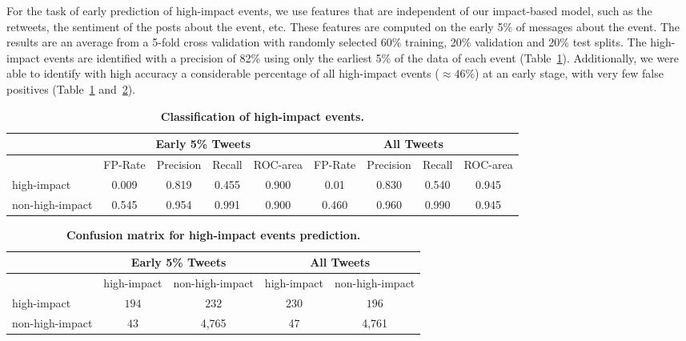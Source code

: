 For the task of early prediction of high-impact events, we use features 
that are independent of our impact-based model, such as
the retweets, the sentiment of the posts about the event, etc. 
These features are computed on the early 5\% of messages about the event.
The results are an average from a 5-fold cross validation with
randomly selected 60\% training, 20\% validation and 20\% test splits.
The high-impact events are identified with a precision of 82\% using
only the earliest 5\% of the data of each event
(Table~\ref{tab:classification_results}).  Additionally, we were able to
identify with high accuracy a considerable percentage of all
high-impact events ($\approx 46\%$) at an early stage, with very few
false positives (Table~\ref{tab:classification_results} and~\ref{tab:confusion_matrix}).

\begin{table}
  \centering
  {\small
    \begin{tabularx}{\textwidth}{lcccc|cccc}
      \toprule
      & \multicolumn{4}{c}{\textbf{Early 5\% Tweets}} & \multicolumn{4}{c}{\textbf{All Tweets}} \\
      \midrule
      & FP-Rate & Precision & Recall & ROC-area & FP-Rate & Precision & Recall & ROC-area \\
      high-impact & 0.009 & 0.819 & 0.455 & 0.900 & 0.01 & 0.830 & 0.540 & 0.945 \\
      non-high-impact & 0.545 & 0.954 & 0.991 & 0.900 &  0.460 & 0.960 & 0.990 & 0.945 \\
      \bottomrule
    \end{tabularx}
  }
  \caption{\textbf{Classification of high-impact events.}}
  \label{tab:classification_results}
\end{table}

\begin{table}
  \centering
  \begin{tabularx}{\textwidth}{lcc|cc}
    \toprule
    \multirow{2}{*}{ }& \multicolumn{2}{c}{\textbf{Early 5\% Tweets}} & \multicolumn{2}{c}{\textbf{All Tweets}} \\
    \midrule
    & high-impact & non-high-impact & high-impact & non-high-impact \\
    high-impact & $194$ & $232$ & $230$ & $196$\\
    non-high-impact & $43$ & 4,765 & 47 & 4,761 \\
    \bottomrule
  \end{tabularx}
  \caption{\textbf{Confusion matrix for high-impact events prediction.}}
  \label{tab:confusion_matrix}
\end{table}



